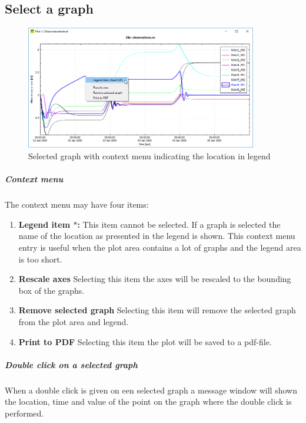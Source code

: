 \documentclass{deltares_memo}
\begin{document}
\subsection{Select a graph}
\begin{figure}[H]
    \centering    
    \includegraphics[width=0.9\textwidth]{pictures/plot_context_menu.png}
    \caption{Selected graph with context menu indicating the location in legend\label{fig:selected graph_with_context_menu}}
\end{figure}
\subparagraph*{Context menu}
The context menu may have four items:
\begin{enumerate}
    \item \textbf{Legend item $\ast$:}\newline
    This item cannot be selected. 
    If a graph is selected the name of the location as presented in the legend is shown. 
    This context menu entry is useful when the plot area contains a lot of graphs and the legend area is too short.
    \item \textbf{Rescale axes}\newline
    Selecting this item the axes will be rescaled to the bounding box of the graphs.
    \item \textbf{Remove selected graph}\newline
    Selecting this item will remove the selected graph from the plot area and legend.
    \item \textbf{Print to PDF}\newline
    Selecting this item the plot will be saved to a pdf-file.
\end{enumerate}
\subparagraph*{Double click on a selected graph}
When a double click is given on een selected graph a message window will shown the location, time and value of the point on the graph where the double click is performed.
\end{document}
